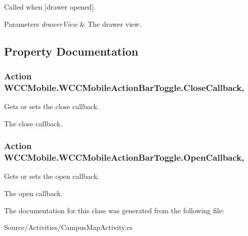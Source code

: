 Called when \mbox{[}drawer opened\mbox{]}. 


\begin{DoxyParams}{Parameters}
{\em drawer\+View} & The drawer view.\\
\hline
\end{DoxyParams}


\subsection{Property Documentation}
\subsubsection[{\texorpdfstring{Close\+Callback}{CloseCallback}}]{\setlength{\rightskip}{0pt plus 5cm}Action W\+C\+C\+Mobile.\+W\+C\+C\+Mobile\+Action\+Bar\+Toggle.\+Close\+Callback\hspace{0.3cm}{\ttfamily [get]}, {\ttfamily [set]}}\hypertarget{class_w_c_c_mobile_1_1_w_c_c_mobile_action_bar_toggle_aea8db24fab6dffb838f246cf4704b804}{}\label{class_w_c_c_mobile_1_1_w_c_c_mobile_action_bar_toggle_aea8db24fab6dffb838f246cf4704b804}


Gets or sets the close callback. 

The close callback. 
\subsubsection[{\texorpdfstring{Open\+Callback}{OpenCallback}}]{\setlength{\rightskip}{0pt plus 5cm}Action W\+C\+C\+Mobile.\+W\+C\+C\+Mobile\+Action\+Bar\+Toggle.\+Open\+Callback\hspace{0.3cm}{\ttfamily [get]}, {\ttfamily [set]}}\hypertarget{class_w_c_c_mobile_1_1_w_c_c_mobile_action_bar_toggle_ab67f063b3a4e7896fc8cd982b24952e0}{}\label{class_w_c_c_mobile_1_1_w_c_c_mobile_action_bar_toggle_ab67f063b3a4e7896fc8cd982b24952e0}


Gets or sets the open callback. 

The open callback. 

The documentation for this class was generated from the following file\+:\begin{DoxyCompactItemize}
\item 
Source/\+Activities/Campus\+Map\+Activity.\+cs\end{DoxyCompactItemize}
